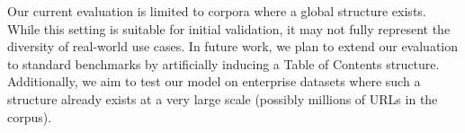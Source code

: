 Our current evaluation is limited to corpora where a global structure exists. While this setting is suitable for initial validation, it may not fully represent the diversity of real-world use cases. In future work, we plan to extend our evaluation to standard benchmarks by artificially inducing a Table of Contents structure. Additionally, we aim to test our model on enterprise datasets where such a structure already exists at a very large scale (possibly millions of URLs in the corpus).

